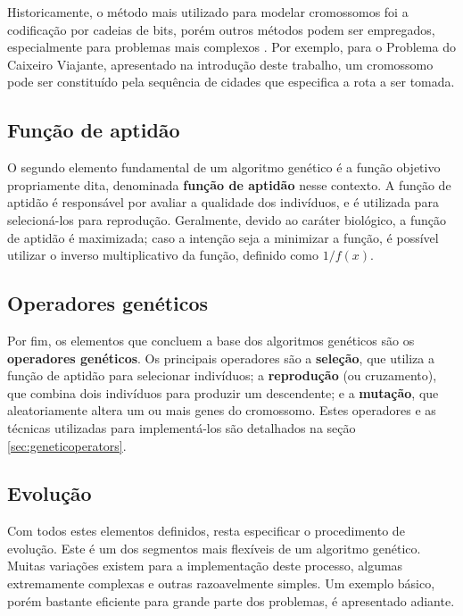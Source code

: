 \documentclass[12pt]{article}
\begin{document}
Historicamente, o método mais utilizado para modelar cromossomos foi a codificação por cadeias de bits, porém outros métodos podem ser empregados, especialmente para problemas mais complexos \cite{Mitchell1998}. Por exemplo, para o Problema do Caixeiro Viajante, apresentado na introdução deste trabalho, um cromossomo pode ser constituído pela sequência de cidades que especifica a rota a ser tomada.

\subsection{Função de aptidão} \label{sec:fitnessfunction}

O segundo elemento fundamental de um algoritmo genético é a função objetivo propriamente dita, denominada \textbf{função de aptidão} nesse contexto. A função de aptidão é responsável por avaliar a qualidade dos indivíduos, e é utilizada para selecioná-los para reprodução. Geralmente, devido ao caráter biológico, a função de aptidão é maximizada; caso a intenção seja a minimizar a função, é possível utilizar o inverso multiplicativo da função, definido como $1 / f(x)$.

\subsection{Operadores genéticos} \label{sec:operatorsbrief}

Por fim, os elementos que concluem a base dos algoritmos genéticos são os \textbf{operadores genéticos}. Os principais operadores são a \textbf{seleção}, que utiliza a função de aptidão para selecionar indivíduos; a \textbf{reprodução} (ou cruzamento), que combina dois indivíduos para produzir um descendente; e a \textbf{mutação}, que aleatoriamente altera um ou mais genes do cromossomo. Estes operadores e as técnicas utilizadas para implementá-los são detalhados na seção \ref{sec:geneticoperators}.

\subsection{Evolução} \label{sec:evolution}

Com todos estes elementos definidos, resta especificar o procedimento de evolução. Este é um dos segmentos mais flexíveis de um algoritmo genético. Muitas variações existem para a implementação deste processo, algumas extremamente complexas e outras razoavelmente simples. Um exemplo básico, porém bastante eficiente para grande parte dos problemas, é apresentado adiante.
\end{document}
